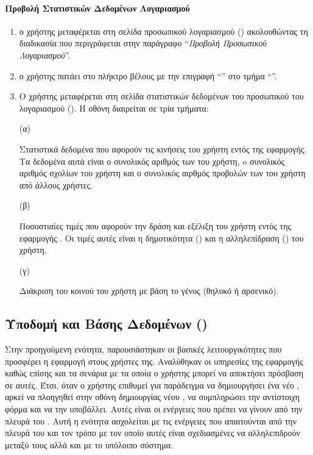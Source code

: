 \paragraph{Προβολή Στατιστικών Δεδομένων Λογαριασμού}
\begin{enumerate}
     \item ο χρήστης μεταφέρεται στη σελίδα προσωπικού λογαριασμού (\textit{}) ακολουθώντας τη διαδικασία που περιγράφεται στην παράγραφο ``\textit{Προβολή Προσωπικού Λογαριασμού}''.
    \item ο χρήστης πατάει στο πλήκτρο βέλους με την επιγραφή ``\textit{}'' στο τμήμα ``\textit{}''.
    \item Ο χρήστης μεταφέρεται στη σελίδα στατιστικών δεδομένων του προσωπικού του λογαριασμού (\textit{}). Η οθόνη διαιρείται σε τρία τμήματα: 
    
    (α) 
    
    Στατιστικά δεδομένα που αφορούν τις κινήσεις του χρήστη εντός της εφαρμογής. Τα δεδομένα αυτά είναι ο συνολικός αριθμός των  του χρήστη, o συνολικός αριθμός σχολίων του χρήστη και ο συνολικός αιρθμός προβολών των   του χρήστη από άλλους χρήστες.
    
    (β) 
    
    Ποσοστιαίες τιμές που αφορούν την δράση και εξέλιξη του χρήστη εντός της εφαρμογής . Οι τιμές αυτές είναι η δημοτικότητα () και η αλληλεπίδραση () του χρήστη.
    
    (γ) 
    
    Διάκριση του κοινού του χρήστη με βάση το γένος (θηλυκό ή αρσενικό). 
    
\end{enumerate}





\subsection{Υποδομή  και Βάσης Δεδομένων (\textit{})}
Στην προηγούμενη ενότητα, παρουσιάστηκαν οι βασικές λειτουργικότητες που προσφέρει η εφαρμογή στους χρήστες της. Αναλύθηκαν οι υπηρεσίες της εφαρμογής καθώς επίσης και τα σενάρια με τα οποία ο χρήστης μπορεί να αποκτήσει πρόσβαση σε αυτές. Έτσι, όταν ο χρήστης επιθυμεί για παράδειγμα να δημιουργήσει ένα νέο , αρκεί να πλοηγηθεί στην οθόνη δημιουργίας νέου , να συμπληρώσει την αντίστοιχη φόρμα και να την υποβάλλει. Αυτές είναι οι ενέργειες που πρέπει να γίνουν από την πλευρά του . Αυτή η ενότητα ασχολείται με τις ενέργειες που απαιτούνται από την πλευρά του  και τον τρόπο με τον οποίο αυτές είναι σχεδιασμένες να αλληλεπιδρούν μεταξύ τους αλλά και με το υπόλοιπο σύστημα.

